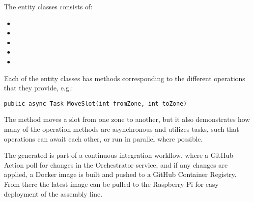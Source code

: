 The entity classes consists of:
\begin{itemize}
    \item {}
    \item {}
    \item {}
    \item {}
    \item {}
\end{itemize}

Each of the entity classes has methods corresponding to the different operations that they provide, e.g.:

\begin{verbatim}
public async Task MoveSlot(int fromZone, int toZone)
\end{verbatim}

The  method moves a slot from one zone to another, but it also demonstrates how many of the operation methods are asynchronous and utilizes tasks, such that operations can await each other, or run in parallel where possible.

The generated  is part of a continuous integration workflow, where a GitHub Action poll for changes in the Orchestrator service, and if any changes are applied, a Docker image is built and pushed to a GitHub Container Registry. From there the latest image can be pulled to the Raspberry Pi for easy deployment of the assembly line.


